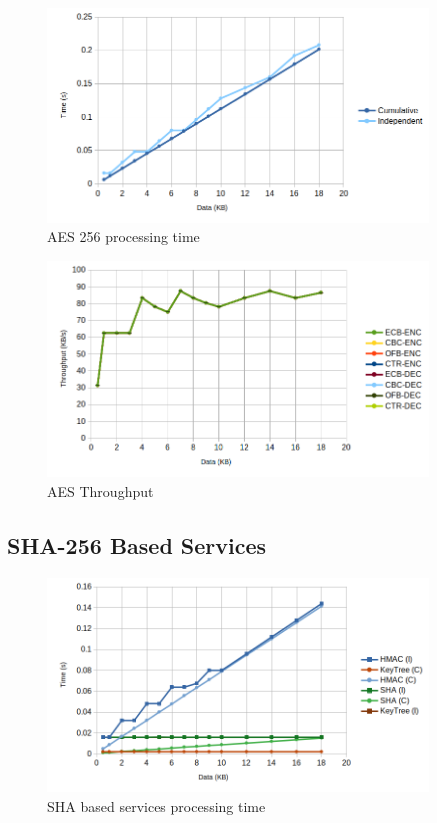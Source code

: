 \begin{figure}[h!]
	\centering
	\includegraphics[width=0.9\textwidth]{./Images/aes256-compare.png}
	\caption{AES 256 processing time}
	\label{fig:performance:aes256:compare}
\end{figure}

\begin{figure}[h!]
	\centering
	\includegraphics[width=0.9\textwidth]{./Images/aes128-tput.png}
	\caption{AES Throughput}
	\label{fig:performance:aes:tput}
\end{figure}

\subsection{SHA-256 Based Services}\label{chap:evaluation:board:sha}

\begin{figure}[h!]
	\centering
	\includegraphics[width=0.9\textwidth]{./Images/sha-compare.png}
	\caption{SHA based services processing time}
	\label{fig:performance:sha:compare}
\end{figure}

